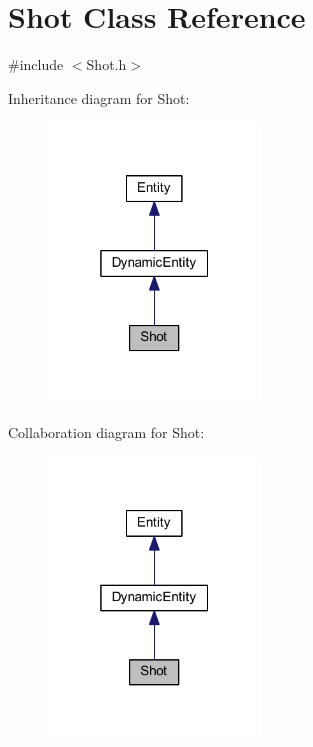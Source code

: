 \hypertarget{class_shot}{
\section{Shot Class Reference}
\label{de/d74/class_shot}
}


{\ttfamily \#include $<$Shot.h$>$}



Inheritance diagram for Shot:
\nopagebreak
\begin{figure}[H]
\begin{center}
\leavevmode
\includegraphics[width=160pt]{d8/d89/class_shot__inherit__graph}
\end{center}
\end{figure}


Collaboration diagram for Shot:
\nopagebreak
\begin{figure}[H]
\begin{center}
\leavevmode
\includegraphics[width=160pt]{d1/d5c/class_shot__coll__graph}
\end{center}
\end{figure}
